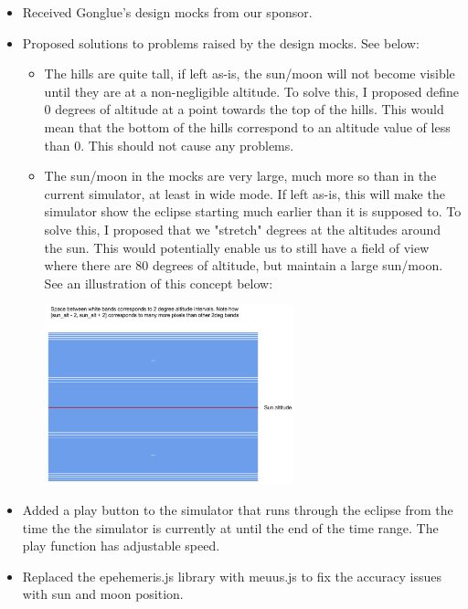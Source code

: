 \documentclass[10pt, onecolumn, draftclsnofoot, letterpaper, compsoc]{IEEEtran}
\begin{document}
    \begin{itemize}

    \item Received Gonglue's design mocks from our sponsor.

	\item Proposed solutions to problems raised by the design mocks. See below:

		\begin{itemize}

		\item The hills are quite tall, if left as-is, the sun/moon will not become
			  visible until they are at a non-negligible altitude. To solve this,
			  I proposed define 0 degrees of altitude at a point towards the top of the
			  hills. This would mean that the bottom of the hills correspond to an altitude
			  value of less than 0. This should not cause any problems.

		\item The sun/moon in the mocks are very large, much more so than in the current
			  simulator, at least in wide mode. If left as-is, this will make the simulator
			  show the eclipse starting much earlier than it is supposed to. To solve this, I
			  proposed that we "stretch" degrees at the altitudes around the sun. This would
			  potentially enable us to still have a field of view where there are 80 degrees
			  of altitude, but maintain a large sun/moon. See an illustration of this concept below:

			  \begin{center}
			  	\includegraphics[width=0.6\textwidth]{angle.eps}
			  \end{center}

		\end{itemize}

    \item Added a play button to the simulator that runs through the eclipse from the time the
          the simulator is currently at until the end of the time range. The play function has
          adjustable speed.

    \item Replaced the epehemeris.js library with meuus.js to fix the accuracy issues with sun and
          moon position.

    \end{itemize}
\end{document}
